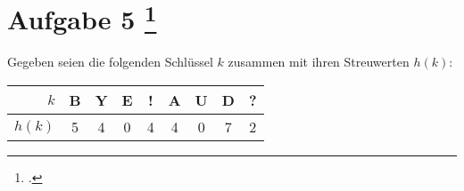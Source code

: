 \documentclass{lehramt-informatik-aufgabe}
\begin{document}
\section{Aufgabe 5
\footcite{examen:66115:2020:09}}

Gegeben seien die folgenden Schlüssel $k$ zusammen mit ihren Streuwerten
$h(k)$:

\begin{center}
\begin{tabular}{|r||c|c|c|c|c|c|c|c|}
\hline
$k$    & B & Y & E & ! & A & U & D & ? \\\hline
$h(k)$ & 5 & 4 & 0 & 4 & 4 & 0 & 7 & 2 \\\hline
\end{tabular}
\end{center}
\end{document}
